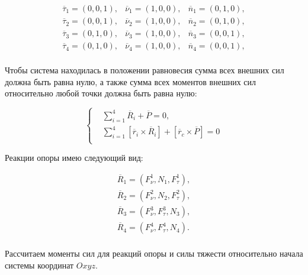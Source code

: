 \begin{equation}
\label{articulated:case_1_orts}
  \begin{alignedat}{3}
    \overline{\tau}_1 = (0,0,1),&\overline{\nu}_1 = (1,0,0),&\overline{n}_1 = (0,1,0),\\
    \overline{\tau}_2 = (0,0,1),&\overline{\nu}_2 = (1,0,0),&\overline{n}_2 = (0,1,0),\\
    \overline{\tau}_3 = (0,1,0),&\overline{\nu}_3 = (1,0,0),&\overline{n}_3 = (0,0,1),\\
    \overline{\tau}_4 = (0,1,0),&\overline{\nu}_4 = (1,0,0),&\overline{n}_4 = (0,0,1),\\
  \end{alignedat}
\end{equation}


Чтобы система находилась в положении равновесия сумма всех внешних сил должна быть равна нулю, а также сумма всех моментов внешних сил относительно любой точки должна быть равна нулю:

\begin{equation}
\label{eq:general_static_equations}
  \left\{
    \begin{alignedat}{3}
      &\sum_{i=1}^4\overline{R}_i+\overline{P} = 0, \\
      &\sum_{i=1}^4[\overline{r}_i\times\overline{R}_i] + [\overline{r}_c\times\overline{P}] = 0\\
    \end{alignedat}
  \right.
\end{equation}


Реакции опоры имею следующий вид:

\begin{equation}
\label{articulated:case_1_forces}
\begin{alignedat}{2}
  \overline{R}_1 = (F^1_\nu, N_1, F^1_\tau),\\
  \overline{R}_2 = (F^2_\nu, N_2, F^2_\tau),\\
  \overline{R}_3 = (F^3_\nu, F^3_\tau, N_3),\\
  \overline{R}_4 = (F^4_\nu, F^4_\tau, N_4).\\
\end{alignedat}
\end{equation}

Рассчитаем моменты сил для реакций опоры и силы тяжести относительно начала системы координат $Oxyz$.

